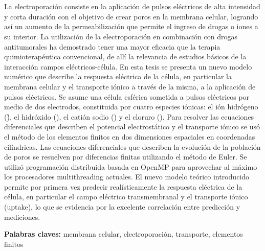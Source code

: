 \chapter*{\runtitulo}

\noindent 
La electroporación consiste en la aplicación de pulsos eléctricos de alta intensidad y corta duración con el objetivo de crear poros en la membrana celular, logrando así un aumento de la permeabilización que permite el ingreso de drogas o iones a su interior. La utilización de la electroporación en combinación con drogas antitumorales ha demostrado tener una mayor eficacia que la terapia quimioterapéutica convencional, de allí la relevancia de estudios básicos de la interacción campos eléctricos-célula. En esta tesis se presenta un nuevo modelo numérico que describe la respuesta eléctrica de la célula, en particular la membrana celular y el transporte iónico a través de la misma, a la aplicación de pulsos eléctricos. Se asume una célula esférica sometida a pulsos eléctricos por medio de dos electrodos, constituida por cuatro especies iónicas: el ión hidrógeno (\h), el hidróxido (\oh), el catión sodio (\na) y el cloruro (\cl). Para resolver las ecuaciones diferenciales que describen el potencial electrostático y el transporte iónico se usó el método de los elementos finitos en dos dimensiones espaciales en coordenadas cilíndricas. Las ecuaciones diferenciales que describen la evolución de la población de poros se resuelven por diferencias finitas utilizando el método de Euler. Se utilizó programación distribuida basada en OpenMP para aprovechar al máximo los procesadores multithreading actuales. El nuevo modelo teórico introducido permite  por primera vez  predecir realísticamente la respuesta eléctrica de la célula, en particular el campo eléctrico transmembranal y el transporte iónico (uptake), lo que se evidencia por la excelente correlación entre predicción y mediciones.


\bigskip

\noindent\textbf{Palabras claves:} membrana celular, electroporación, transporte, elementos finitos
